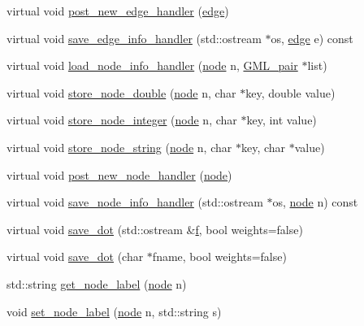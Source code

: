 \begin{DoxyCompactItemize}
\item 
virtual void \mbox{\hyperlink{class_my_graph_a7d8f03bae7c6a731718385ae4e546d98}{post\+\_\+new\+\_\+edge\+\_\+handler}} (\mbox{\hyperlink{classedge}{edge}})
\item 
virtual void \mbox{\hyperlink{class_my_graph_aa2c8ff76d5443d4788ecfebc8f799182}{save\+\_\+edge\+\_\+info\+\_\+handler}} (std\+::ostream $\ast$os, \mbox{\hyperlink{classedge}{edge}} e) const
\item 
virtual void \mbox{\hyperlink{class_my_graph_acef355f66e5aeb19265a9860f2920381}{load\+\_\+node\+\_\+info\+\_\+handler}} (\mbox{\hyperlink{classnode}{node}} n, \mbox{\hyperlink{struct_g_m_l__pair}{G\+M\+L\+\_\+pair}} $\ast$list)
\item 
virtual void \mbox{\hyperlink{class_my_graph_a16b037dbb0011fc50367145c477ac7a4}{store\+\_\+node\+\_\+double}} (\mbox{\hyperlink{classnode}{node}} n, char $\ast$key, double value)
\item 
virtual void \mbox{\hyperlink{class_my_graph_a4f5922407f2f3fac566d1045d98da46f}{store\+\_\+node\+\_\+integer}} (\mbox{\hyperlink{classnode}{node}} n, char $\ast$key, int value)
\item 
virtual void \mbox{\hyperlink{class_my_graph_a1ca3d219454d57b8fc5ce67eaaf33013}{store\+\_\+node\+\_\+string}} (\mbox{\hyperlink{classnode}{node}} n, char $\ast$key, char $\ast$value)
\item 
virtual void \mbox{\hyperlink{class_my_graph_a21153d685303a6d2cfeee913aeb81223}{post\+\_\+new\+\_\+node\+\_\+handler}} (\mbox{\hyperlink{classnode}{node}})
\item 
virtual void \mbox{\hyperlink{class_my_graph_ad5f4b3ce70135723fe08a301d20c4a8a}{save\+\_\+node\+\_\+info\+\_\+handler}} (std\+::ostream $\ast$os, \mbox{\hyperlink{classnode}{node}} n) const
\item 
virtual void \mbox{\hyperlink{class_my_graph_acf68ca166eebb43a80b722c6ef15d22c}{save\+\_\+dot}} (std\+::ostream \&\mbox{\hyperlink{rings_8cpp_a77369fc4d5326a16d2c603e032023528}{f}}, bool weights=false)
\item 
virtual void \mbox{\hyperlink{class_my_graph_a646cfd85f487b7f7b8fd9f074bd595ca}{save\+\_\+dot}} (char $\ast$fname, bool weights=false)
\item 
std\+::string \mbox{\hyperlink{class_my_graph_ab92ebd7632157e681a6a7d7873841de7}{get\+\_\+node\+\_\+label}} (\mbox{\hyperlink{classnode}{node}} n)
\item 
void \mbox{\hyperlink{class_my_graph_ac70ce0dc28c8589443e45ef89acd00ca}{set\+\_\+node\+\_\+label}} (\mbox{\hyperlink{classnode}{node}} n, std\+::string s)

\end{DoxyCompactItemize}
